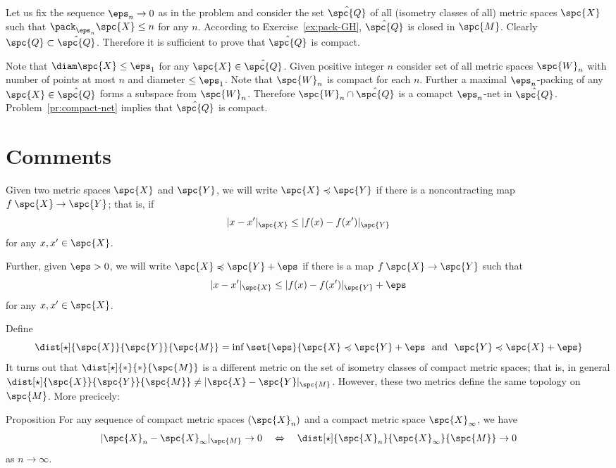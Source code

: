 Let us fix the sequence $\eps_n\to 0$ as in the problem and consider the set $\hat{\spc{Q}}$ of all (isometry classes of all) metric spaces $\spc{X}$ such that
$\pack_{\eps_n} \spc{X}\le n$ for any $n$. 
According to Exercise~\ref{ex:pack-GH}, $\hat{\spc{Q}}$ is closed in $\spc{M}$.
Clearly $\spc{Q}\subset\hat{\spc{Q}}$.
Therefore it is sufficient to prove that $\hat{\spc{Q}}$ is compact.

Note that $\diam \spc{X}\le \eps_1$ for any $\spc{X}\in \hat{\spc{Q}}$.
Given positive integer $n$ consider set of all metric spaces $\spc{W}_n$
with number of points at most $n$ and diameter $\le \eps_1$.
Note that $\spc{W}_n$ is compact for each $n$.
Further a maximal $\eps_n$-packing of any $\spc{X}\in\hat{\spc{Q}}$ forms a subspace from $\spc{W}_n$.
Therefore $\spc{W}_n\cap\hat{\spc{Q}}$ is a comapct $\eps_n$-net in  $\hat{\spc{Q}}$.
Problem~\ref{pr:compact-net} implies that $\hat{\spc{Q}}$ is compact.
\qeds



\section{Comments} 

Given two metric spaces $\spc{X}$ and $\spc{Y}$, we will write $\spc{X}\preccurlyeq \spc{Y}$ if there is a noncontracting map $f\:\spc{X}\to \spc{Y}$;
that is, if 
$$ |x-x'|_{\spc{X}}\le|f(x)-f(x')|_{\spc{Y}}$$
for any $x,x'\in \spc{X}$.

Further, given $\eps>0$, we will write $\spc{X}\preccurlyeq \spc{Y}+\eps$
if there is a map $f\:\spc{X}\to \spc{Y}$ such that 
$$|x-x'|_{\spc{X}}\le|f(x)-f(x')|_{\spc{Y}}+\eps$$
for any $x,x'\in \spc{X}$.

Define 
$$\dist[\star]{\spc{X}}{\spc{Y}}{\spc{M}}=\inf\set{\eps}{\spc{X}\preccurlyeq \spc{Y}+\eps\ \ \text{and}\ \ \spc{Y}\preccurlyeq \spc{X}+\eps}$$
It turns out that $\dist[\star]{*}{*}{\spc{M}}$ is a different metric on the set of isometry classes of compact metric spaces; that is, in general $\dist[\star]{\spc{X}}{\spc{Y}}{\spc{M}}\not=|\spc{X}-\spc{Y}|_{\spc{M}}$. 
However, these two metrics define the same topology on $\spc{M}$.
More precicely:

\begin{thm}{Proposition}\label{GH-po}
For any sequence of compact metric spaces $(\spc{X}_n)$ and a compact metric space $\spc{X}_\infty$,
we have
$$|\spc{X}_n-\spc{X}_\infty|_{\spc{M}}\to 0 \ \ \ \Leftrightarrow\ \ \ \dist[\star]{\spc{X}_n}{\spc{X}_\infty}{\spc{M}}\to 0$$ 
as $n\to\infty$.
\end{thm}

